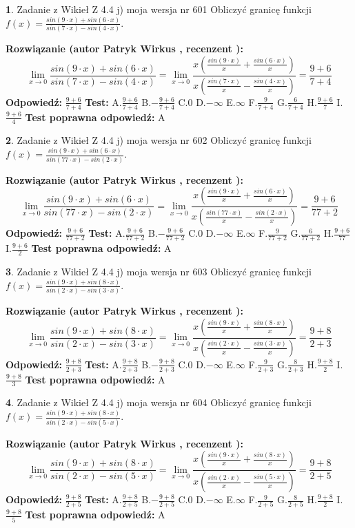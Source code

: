 \documentclass[12pt, a4paper]{article}
\theoremstyle{definition} %
\newtheorem{zad}{}
\newcommand{\zadStart}[1]{\begin{zad}#1\newline}
\newcommand{\zadStop}{\end{zad}}
\newcommand{\rozwStart}[2]{\noindent \textbf{Rozwiązanie (autor #1 , recenzent #2): }\newline}
\newcommand{\rozwStop}{\newline}
\newcommand{\odpStart}{\noindent \textbf{Odpowiedź:}\newline}
\newcommand{\odpStop}{\newline}
\newcommand{\testStart}{\noindent \textbf{Test:}\newline}
\newcommand{\testStop}{\newline}
\newcommand{\kluczStart}{\noindent \textbf{Test poprawna odpowiedź:}\newline}
\newcommand{\kluczStop}{\newline}
\begin{document}
\zadStart{Zadanie z Wikieł Z 4.4 j) moja wersja nr 601}
Obliczyć granicę funkcji $f(x)=\frac{sin(9\cdot x) +sin(6\cdot x)}{sin(7\cdot x) -sin(4\cdot x)}$.
\zadStop
\rozwStart{Patryk Wirkus}{}
$$\lim\limits_{x\to 0}\frac{sin(9\cdot x) +sin(6\cdot x)}{sin(7\cdot x) -sin(4\cdot x)}=\lim\limits_{x\to 0}\frac{x(\frac{sin(9\cdot x)}{x}+\frac{sin(6\cdot x)}{x})}{x(\frac{sin(7\cdot x)}{x}-\frac{sin(4\cdot x)}{x})}=\frac{9+6}{7+4}$$
\rozwStop
\odpStart
$\frac{9+6}{7+4}$
\odpStop
\testStart
A.$\frac{9+6}{7+4}$
B.$-\frac{9+6}{7+4}$
C.$0$
D.$-\infty$
E.$\infty$
F.$\frac{9}{7+4}$
G.$\frac{6}{7+4}$
H.$\frac{9+6}{7}$
I.$\frac{9+6}{4}$
\testStop
\kluczStart
A
\kluczStop



\zadStart{Zadanie z Wikieł Z 4.4 j) moja wersja nr 602}
Obliczyć granicę funkcji $f(x)=\frac{sin(9\cdot x) +sin(6\cdot x)}{sin(77\cdot x) -sin(2\cdot x)}$.
\zadStop
\rozwStart{Patryk Wirkus}{}
$$\lim\limits_{x\to 0}\frac{sin(9\cdot x) +sin(6\cdot x)}{sin(77\cdot x) -sin(2\cdot x)}=\lim\limits_{x\to 0}\frac{x(\frac{sin(9\cdot x)}{x}+\frac{sin(6\cdot x)}{x})}{x(\frac{sin(77\cdot x)}{x}-\frac{sin(2\cdot x)}{x})}=\frac{9+6}{77+2}$$
\rozwStop
\odpStart
$\frac{9+6}{77+2}$
\odpStop
\testStart
A.$\frac{9+6}{77+2}$
B.$-\frac{9+6}{77+2}$
C.$0$
D.$-\infty$
E.$\infty$
F.$\frac{9}{77+2}$
G.$\frac{6}{77+2}$
H.$\frac{9+6}{77}$
I.$\frac{9+6}{2}$
\testStop
\kluczStart
A
\kluczStop



\zadStart{Zadanie z Wikieł Z 4.4 j) moja wersja nr 603}
Obliczyć granicę funkcji $f(x)=\frac{sin(9\cdot x) +sin(8\cdot x)}{sin(2\cdot x) -sin(3\cdot x)}$.
\zadStop
\rozwStart{Patryk Wirkus}{}
$$\lim\limits_{x\to 0}\frac{sin(9\cdot x) +sin(8\cdot x)}{sin(2\cdot x) -sin(3\cdot x)}=\lim\limits_{x\to 0}\frac{x(\frac{sin(9\cdot x)}{x}+\frac{sin(8\cdot x)}{x})}{x(\frac{sin(2\cdot x)}{x}-\frac{sin(3\cdot x)}{x})}=\frac{9+8}{2+3}$$
\rozwStop
\odpStart
$\frac{9+8}{2+3}$
\odpStop
\testStart
A.$\frac{9+8}{2+3}$
B.$-\frac{9+8}{2+3}$
C.$0$
D.$-\infty$
E.$\infty$
F.$\frac{9}{2+3}$
G.$\frac{8}{2+3}$
H.$\frac{9+8}{2}$
I.$\frac{9+8}{3}$
\testStop
\kluczStart
A
\kluczStop



\zadStart{Zadanie z Wikieł Z 4.4 j) moja wersja nr 604}
Obliczyć granicę funkcji $f(x)=\frac{sin(9\cdot x) +sin(8\cdot x)}{sin(2\cdot x) -sin(5\cdot x)}$.
\zadStop
\rozwStart{Patryk Wirkus}{}
$$\lim\limits_{x\to 0}\frac{sin(9\cdot x) +sin(8\cdot x)}{sin(2\cdot x) -sin(5\cdot x)}=\lim\limits_{x\to 0}\frac{x(\frac{sin(9\cdot x)}{x}+\frac{sin(8\cdot x)}{x})}{x(\frac{sin(2\cdot x)}{x}-\frac{sin(5\cdot x)}{x})}=\frac{9+8}{2+5}$$
\rozwStop
\odpStart
$\frac{9+8}{2+5}$
\odpStop
\testStart
A.$\frac{9+8}{2+5}$
B.$-\frac{9+8}{2+5}$
C.$0$
D.$-\infty$
E.$\infty$
F.$\frac{9}{2+5}$
G.$\frac{8}{2+5}$
H.$\frac{9+8}{2}$
I.$\frac{9+8}{5}$
\testStop
\kluczStart
A
\kluczStop
\end{document}
